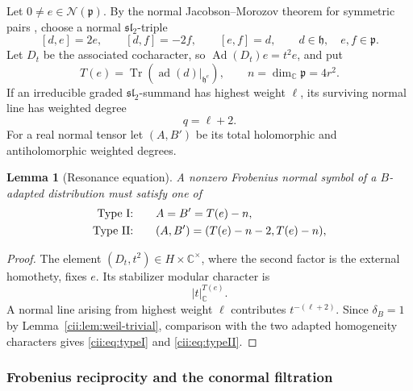 \documentclass[11pt,reqno]{amsart}
\numberwithin{equation}{section}
\newtheorem{lemma}[theorem]{Lemma}
\theoremstyle{definition}
\theoremstyle{remark}
\newcommand{\C}{\mathbb C}
\newcommand{\Ad}{\operatorname{Ad}}
\newcommand{\ad}{\operatorname{ad}}
\newcommand{\Tr}{\operatorname{Tr}}
\newcommand{\cN}{\mathcal N}
\begin{document}
Let \(0\neq e\in\cN(\mathfrak p)\).  By the normal
Jacobson--Morozov theorem for symmetric pairs
\cite[Proposition~4]{KR}, choose a normal
\(\mathfrak{sl}_2\)-triple
\[
[d,e]=2e,\qquad
[d,f]=-2f,\qquad
[e,f]=d,
\qquad
d\in\mathfrak h,\quad e,f\in\mathfrak p.
\]
Let \(D_t\) be the associated cocharacter, so
\(\Ad(D_t)e=t^2e\), and put
\begin{equation}\label{cii:eq:trace}
T(e)=\Tr\!\left(\ad(d)|_{\mathfrak h^e}\right),
\qquad
n=\dim_\C\mathfrak p=4r^2.
\end{equation}
If an irreducible graded \(\mathfrak{sl}_2\)-summand has highest weight
\(\ell\), its surviving normal line has weighted degree
\[
q=\ell+2.
\]
For a real normal tensor let \((A,B')\) be its total holomorphic and
antiholomorphic weighted degrees.

\begin{lemma}[Resonance equation]\label{cii:lem:resonance}
A nonzero Frobenius normal symbol of a \(B\)-adapted distribution must
satisfy one of
\begin{align}
\textnormal{Type I:}\qquad
&A=B'=T(e)-n, \label{cii:eq:typeI}\\
\textnormal{Type II:}\qquad
&(A,B')=(T(e)-n-2,T(e)-n), \label{cii:eq:typeII}
\end{align}
\end{lemma}

\begin{proof}
The element \((D_t,t^2)\in H\times\C^\times\), where the second factor is
the external homothety, fixes \(e\).  Its stabilizer modular character is
\[
|t|_\C^{T(e)}.
\]
A normal line arising from highest weight \(\ell\) contributes
\(t^{-(\ell+2)}\).  Since \(\delta_B=1\) by
Lemma~\ref{cii:lem:weil-trivial}, comparison with the two adapted homogeneity
characters gives \eqref{cii:eq:typeI} and \eqref{cii:eq:typeII}.
\end{proof}

\subsubsection{Frobenius reciprocity and the conormal filtration}
\end{document}
